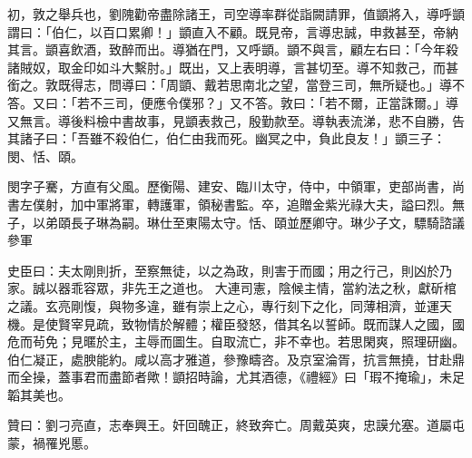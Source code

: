 \begin{pinyinscope}
 初，敦之舉兵也，劉隗勸帝盡除諸王，司空導率群從詣闕請罪，值顗將入，導呼顗謂曰：「伯仁，以百口累卿！」顗直入不顧。既見帝，言導忠誠，申救甚至，帝納其言。顗喜飲酒，致醉而出。導猶在門，又呼顗。顗不與言，顧左右曰：「今年殺諸賊奴，取金印如斗大繫肘。」既出，又上表明導，言甚切至。導不知救己，而甚銜之。敦既得志，問導曰：「周顗、戴若思南北之望，當登三司，無所疑也。」導不答。又曰：「若不三司，便應令僕邪？」又不答。敦曰：「若不爾，正當誅爾。」導
 又無言。導後料檢中書故事，見顗表救己，殷勤款至。導執表流涕，悲不自勝，告其諸子曰：「吾雖不殺伯仁，伯仁由我而死。幽冥之中，負此良友！」顗三子：閔、恬、頤。



 閔字子騫，方直有父風。歷衡陽、建安、臨川太守，侍中，中領軍，吏部尚書，尚書左僕射，加中軍將軍，轉護軍，領秘書監。卒，追贈金紫光祿大夫，謚曰烈。無子，以弟頤長子琳為嗣。琳仕至東陽太守。恬、頤並歷卿守。琳少子文，驃騎諮議參軍



 史臣曰：夫太剛則折，至察無徒，以之為政，則害于而國；用之行己，則凶於乃家。誠以器乖容眾，非先王之道也。
 大連司憲，陰候主情，當約法之秋，獻斫棺之議。玄亮剛愎，與物多違，雖有崇上之心，專行刻下之化，同薄相濟，並運天機。是使賢宰見疏，致物情於解體；權臣發怒，借其名以誓師。既而謀人之國，國危而茍免；見暱於主，主辱而圖生。自取流亡，非不幸也。若思閑爽，照理研幽。伯仁凝正，處腴能約。咸以高才雅道，參豫疇咨。及京室淪胥，抗言無撓，甘赴鼎而全操，蓋事君而盡節者歟！顗招時論，尤其酒德，《禮經》曰「瑕不掩瑜」，未足韜其美也。



 贊曰：劉刁亮直，志奉興王。奸回醜正，終致奔亡。周戴英爽，忠謨允塞。道屬屯蒙，禍罹兇慝。



\end{pinyinscope}